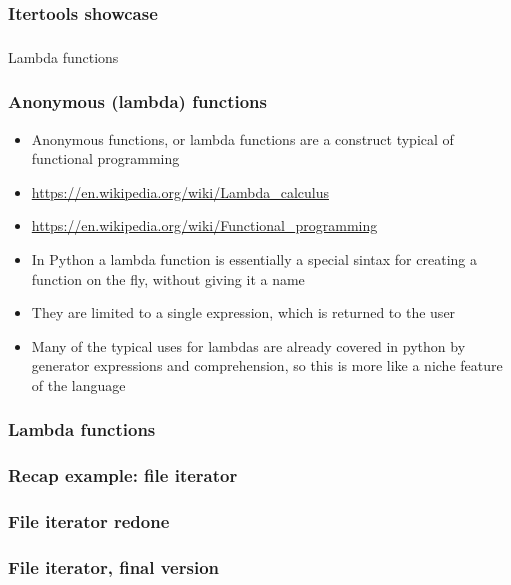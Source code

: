 \documentclass[9pt]{beamer}
\begin{document}
\begin{frame}
  \frametitle{Itertools showcase}
  
\end{frame}


\begin{frame}
  \frametitle{}
  \centering \Large Lambda functions
\end{frame}


\begin{frame}
  \frametitle{Anonymous (lambda) functions}
  \begin{itemize}
    \item \alert{Anonymous functions}, or \alert{lambda functions} are a construct typical of \alert{functional programming}
    \item \url{https://en.wikipedia.org/wiki/Lambda_calculus}
    \item \url{https://en.wikipedia.org/wiki/Functional_programming}
    \item In Python a lambda function is essentially a special sintax for creating a function
          on the fly, without giving it a name
    \item They are limited to \alert{a single expression}, which is returned to the user
    \item Many of the typical uses for lambdas are already covered in python by generator expressions and comprehension,
          so this is more like a niche feature of the language
  \end{itemize}
  
\end{frame}


\begin{frame}
  \frametitle{Lambda functions}
  
\end{frame}


\begin{frame}
  \frametitle{Recap example: file iterator}
  
\end{frame}


\begin{frame}
  \frametitle{File iterator redone}
  
\end{frame}


\begin{frame}
  \frametitle{File iterator, final version}
  
\end{frame}
\end{document}
